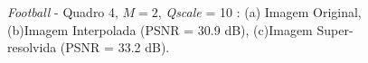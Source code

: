 \begin{figure}[H]
    \centering
    \qquad
	

    \caption{\textit{Football} - Quadro 4, $M = 2$, \textit{Qscale} = 10 : (a) Imagem Original, (b)Imagem Interpolada (PSNR = 30.9 dB), (c)Imagem Super-resolvida (PSNR = 33.2 dB).}
	    
    \label{fig:2}
\end{figure}

